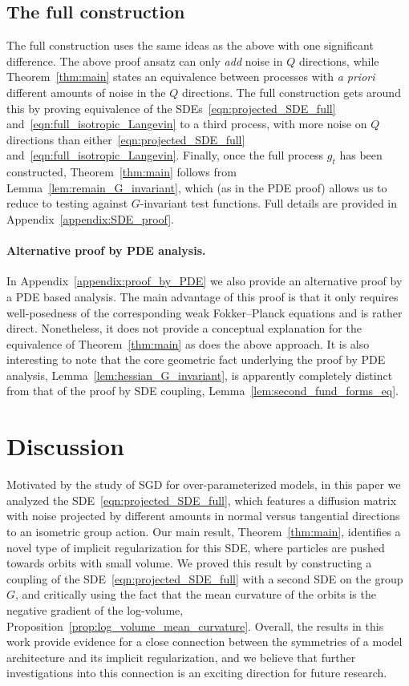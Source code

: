 \documentclass[twoside,a4paper,11pt]{article}
\theoremstyle{plain}
\begin{document}
\subsection{The full construction}
The full construction uses the same ideas as the
above with one significant difference.
The above proof ansatz can only {\it add} noise in
$Q$ directions, while Theorem~\ref{thm:main}
states an equivalence between processes with {\it a priori} 
different amounts of noise in the $Q$ directions.
The full construction gets around this by proving
equivalence of the 
SDEs~\eqref{eqn:projected_SDE_full}
and~\eqref{eqn:full_isotropic_Langevin} 
to a third process, with more noise on $Q$ directions than
either~\eqref{eqn:projected_SDE_full}
and~\eqref{eqn:full_isotropic_Langevin}.
Finally, once the full process $g_t$ has been constructed, Theorem~\ref{thm:main} follows
 from Lemma~\ref{lem:remain_G_invariant},
 which (as in the PDE proof) allows us to reduce
 to testing against $G$-invariant test functions.
 Full details are provided in Appendix~\ref{appendix:SDE_proof}.

 \paragraph*{Alternative proof by PDE analysis.}
 In Appendix~\ref{appendix:proof_by_PDE}
 we also provide an alternative proof
 by a PDE based analysis.
 The main advantage of this proof is that
 it only
 requires
 well-posedness of the corresponding weak
 Fokker--Planck equations and is rather direct.
 Nonetheless, it does not provide
 a conceptual explanation for the equivalence
 of Theorem~\ref{thm:main} as does the above 
 approach. It is also interesting
 to note that the core geometric
 fact underlying the proof by PDE
 analysis, Lemma~\ref{lem:hessian_G_invariant},
 is apparently completely distinct from that
 of the proof by SDE coupling, Lemma~\ref{lem:second_fund_forms_eq}.

\section{Discussion}

Motivated by the study of SGD for over-parameterized
models, in this paper we analyzed the SDE~\eqref{eqn:projected_SDE_full},
which features a diffusion matrix with
noise projected by different
amounts in normal versus tangential directions
to an isometric group action. 
Our main result, Theorem~\ref{thm:main},
identifies a novel type of implicit regularization
for this SDE, where particles are pushed
towards orbits with small volume.
We proved this result by constructing
a coupling of the SDE~\eqref{eqn:projected_SDE_full}
with a second
SDE on the group $G$,
and critically using the fact that the mean curvature of the orbits
is the negative gradient of the log-volume,
Proposition~\ref{prop:log_volume_mean_curvature}.
Overall, the results in this work
provide evidence for a close connection between
the symmetries of a
model architecture and its
implicit regularization,
and we believe
that further investigations into this connection
is an exciting direction for future research.
\end{document}
